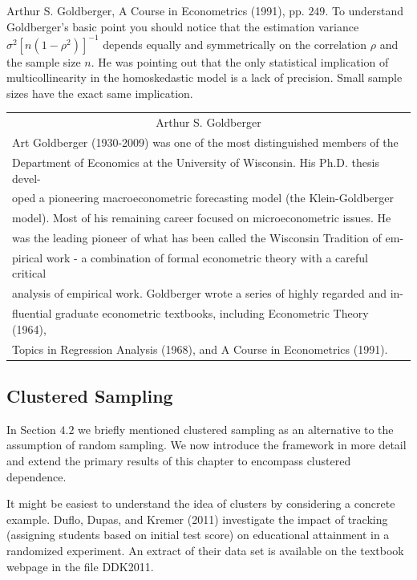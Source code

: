 \documentclass[10pt]{article}
\begin{document}
Arthur S. Goldberger, A Course in Econometrics (1991), pp. $249 .$ To understand Goldberger's basic point you should notice that the estimation variance $\sigma^{2}\left[n\left(1-\rho^{2}\right)\right]^{-1}$ depends equally and symmetrically on the correlation $\rho$ and the sample size $n$. He was pointing out that the only statistical implication of multicollinearity in the homoskedastic model is a lack of precision. Small sample sizes have the exact same implication.

\begin{tabular}{|l|}
\hline
\multicolumn{1}{c|}{Arthur S. Goldberger} \\
Art Goldberger (1930-2009) was one of the most distinguished members of the \\
Department of Economics at the University of Wisconsin. His Ph.D. thesis devel- \\
oped a pioneering macroeconometric forecasting model (the Klein-Goldberger \\
model). Most of his remaining career focused on microeconometric issues. He \\
was the leading pioneer of what has been called the Wisconsin Tradition of em- \\
pirical work - a combination of formal econometric theory with a careful critical \\
analysis of empirical work. Goldberger wrote a series of highly regarded and in- \\
fluential graduate econometric textbooks, including Econometric Theory (1964), \\
Topics in Regression Analysis (1968), and A Course in Econometrics (1991). \\
\end{tabular}

\subsection{Clustered Sampling}
In Section $4.2$ we briefly mentioned clustered sampling as an alternative to the assumption of random sampling. We now introduce the framework in more detail and extend the primary results of this chapter to encompass clustered dependence.

It might be easiest to understand the idea of clusters by considering a concrete example. Duflo, Dupas, and Kremer (2011) investigate the impact of tracking (assigning students based on initial test score) on educational attainment in a randomized experiment. An extract of their data set is available on the textbook webpage in the file DDK2011.
\end{document}
